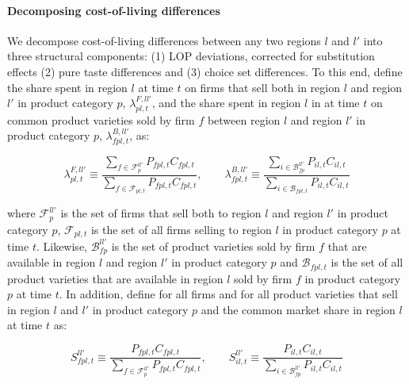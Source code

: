 \paragraph{Decomposing cost-of-living differences} We decompose cost-of-living differences between any two regions $l$ and $l'$ into three structural components: (1) LOP deviations, corrected for substitution effects (2) pure taste differences and (3) choice set differences. To this end, define the share spent in region $l$ at time $t$ on firms that sell both in region $l$ and region $l'$ in product category $p$, $\lambda^{F,ll'}_{pl,t}$, and the share spent in region $l$ in at time $t$ on common product varieties sold by firm $f$ between region $l$ and region $l'$ in product category $p$, $\lambda^{B,ll'}_{fpl,t}$, as: 
\begin{linenomath*}
    \begin{equation*}
        \lambda^{F,ll'}_{pl,t} \equiv  
            \frac{\sum_{f \in \mathcal{F}^{ll'}_p}P_{fpl,t}C_{fpl,t}}
                 {\sum_{f \in \mathcal{F}_{pl,t}} P_{fpl,t}C_{fpl,t}}, \qquad 
        \lambda^{B,ll'}_{fpl,t} \equiv  
                 \frac{\sum_{i \in \mathcal{B}^{ll'}_{fp}}P_{il,t}C_{il,t}}
                      {\sum_{i \in \mathcal{B}_{fpl,t}} P_{il,t}C_{il,t}}
    \end{equation*}
\end{linenomath*}
\noindent where $\mathcal{F}^{ll'}_p$ is the set of firms that sell both to region $l$ and region $l'$ in product category $p$, $\mathcal{F}_{pl,t}$ is the set of all firms selling to region $l$ in product category $p$ at time $t$. Likewise, $\mathcal{B}^{ll'}_{fp}$ is the set of product varieties sold by firm $f$ that are available in region $l$ and region $l'$ in product category $p$ and $\mathcal{B}_{fpl,t}$ is the set of all product varieties that are available in region $l$ sold by firm $f$ in product category $p$ at time $t$. In addition, define for all firms and for all product varieties that sell in region $l$ and $l'$ in product category $p$ and the common market share in region $l$ at time $t$ as: 
\begin{linenomath*}
    \begin{equation*}
        S^{ll'}_{fpl,t} \equiv  
            \frac{P_{fpl,t}C_{fpl,t}}
                 {\sum_{f \in \mathcal{F}^{ll'}_{p}} P_{fpl,t}C_{fpl,t}}, \qquad 
        S^{ll'}_{il,t} \equiv  
                 \frac{P_{il,t}C_{il,t}}
                      {\sum_{i \in \mathcal{B}^{ll'}_{fp}} P_{il,t}C_{il,t}}
    \end{equation*}
\end{linenomath*}
